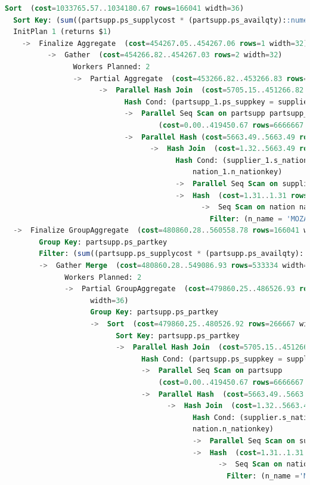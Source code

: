 \documentclass{article}
\begin{document}
\begin{lstlisting}[language=SQL]
Sort  (cost=1033765.57..1034180.67 rows=166041 width=36)
  Sort Key: (sum((partsupp.ps_supplycost * (partsupp.ps_availqty)::numeric))) DESC
  InitPlan 1 (returns $1)
    ->  Finalize Aggregate  (cost=454267.05..454267.06 rows=1 width=32)
          ->  Gather  (cost=454266.82..454267.03 rows=2 width=32)
                Workers Planned: 2
                ->  Partial Aggregate  (cost=453266.82..453266.83 rows=1 width=32)
                      ->  Parallel Hash Join  (cost=5705.15..451266.82 rows=266667 width=10)
                            Hash Cond: (partsupp_1.ps_suppkey = supplier_1.s_suppkey)
                            ->  Parallel Seq Scan on partsupp partsupp_1  
                                    (cost=0.00..419450.67 rows=6666667 width=14)
                            ->  Parallel Hash (cost=5663.49..5663.49 rows=3333 width=4)
                                  ->  Hash Join  (cost=1.32..5663.49 rows=3333 width=4)
                                        Hash Cond: (supplier_1.s_nationkey = 
                                            nation_1.n_nationkey)
                                        ->  Parallel Seq Scan on supplier supplier_1  (cost=0.00..5316.33 rows=83333 width=8)
                                        ->  Hash  (cost=1.31..1.31 rows=1 width=4)
                                              ->  Seq Scan on nation nation_1  (cost=0.00..1.31 rows=1 width=4)
                                                Filter: (n_name = 'MOZAMBIQUE'::bpchar)
  ->  Finalize GroupAggregate  (cost=480860.28..560558.78 rows=166041 width=36)
        Group Key: partsupp.ps_partkey
        Filter: (sum((partsupp.ps_supplycost * (partsupp.ps_availqty)::numeric)) > $1)
        ->  Gather Merge  (cost=480860.28..549086.93 rows=533334 width=36)
              Workers Planned: 2
              ->  Partial GroupAggregate  (cost=479860.25..486526.93 rows=266667 
                    width=36)
                    Group Key: partsupp.ps_partkey
                    ->  Sort  (cost=479860.25..480526.92 rows=266667 width=14)
                          Sort Key: partsupp.ps_partkey
                          ->  Parallel Hash Join  (cost=5705.15..451266.82 rows=266667 width=14)
                                Hash Cond: (partsupp.ps_suppkey = supplier.s_suppkey)
                                ->  Parallel Seq Scan on partsupp  
                                    (cost=0.00..419450.67 rows=6666667 width=18)
                                ->  Parallel Hash  (cost=5663.49..5663.49 rows=3333 width=4)
                                      ->  Hash Join  (cost=1.32..5663.49 rows=3333 width=4)
                                            Hash Cond: (supplier.s_nationkey = 
                                            nation.n_nationkey)
                                            ->  Parallel Seq Scan on supplier  (cost=0.00..5316.33 rows=83333 width=8)
                                            ->  Hash  (cost=1.31..1.31 rows=1 width=4)
                                                  ->  Seq Scan on nation  (cost=0.00..1.31 rows=1 width=4)
                                                    Filter: (n_name ='MOZAMBIQUE'::bpchar)

\end{lstlisting}
\end{document}
